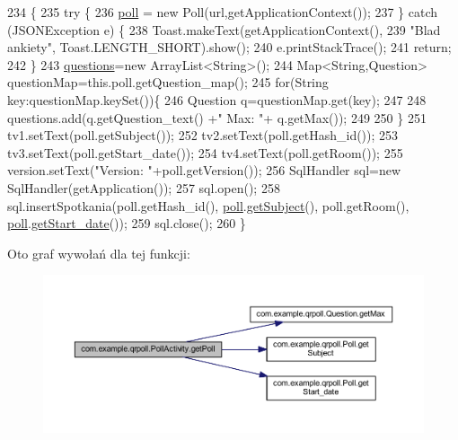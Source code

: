 \begin{DoxyCode}
234                                    \{
235         \textcolor{keywordflow}{try} \{
236             \hyperlink{classcom_1_1example_1_1qrpoll_1_1_poll_activity_accbd807fe57852d64377c5a96401c376}{poll} = \textcolor{keyword}{new} Poll(url,getApplicationContext());
237         \} \textcolor{keywordflow}{catch} (JSONException e) \{
238             Toast.makeText(getApplicationContext(),
239                     \textcolor{stringliteral}{"Blad ankiety"}, Toast.LENGTH\_SHORT).show();
240             e.printStackTrace();
241             \textcolor{keywordflow}{return};
242         \}
243         \hyperlink{classcom_1_1example_1_1qrpoll_1_1_poll_activity_ae9caea6dcd77802d9edc7f86ace0fc5c}{questions}=\textcolor{keyword}{new} ArrayList<String>();
244         Map<String,Question> questionMap=this.poll.getQuestion\_map();
245         \textcolor{keywordflow}{for}(String key:questionMap.keySet())\{
246             Question q=questionMap.get(key);
247             
248             questions.add(q.getQuestion\_text() +\textcolor{stringliteral}{"   Max: "}+ q.getMax());
249             
250         \}
251         tv1.setText(poll.getSubject());
252         tv2.setText(poll.getHash\_id());
253         tv3.setText(poll.getStart\_date());
254         tv4.setText(poll.getRoom());
255         version.setText(\textcolor{stringliteral}{"Version: "}+poll.getVersion());
256         SqlHandler sql=\textcolor{keyword}{new} SqlHandler(getApplication());
257         sql.open();
258         sql.insertSpotkania(poll.getHash\_id(), \hyperlink{classcom_1_1example_1_1qrpoll_1_1_poll_activity_accbd807fe57852d64377c5a96401c376}{poll}.\hyperlink{classcom_1_1example_1_1qrpoll_1_1_poll_af744727f34328a8fec2cb1aba1bc5f66}{getSubject}(), poll.getRoom(), 
      \hyperlink{classcom_1_1example_1_1qrpoll_1_1_poll_activity_accbd807fe57852d64377c5a96401c376}{poll}.\hyperlink{classcom_1_1example_1_1qrpoll_1_1_poll_a51e13329a38c4ee0fc09ccac02ae5afe}{getStart\_date}());
259         sql.close();
260         \}
\end{DoxyCode}


Oto graf wywołań dla tej funkcji\+:
\nopagebreak
\begin{figure}[H]
\begin{center}
\leavevmode
\includegraphics[width=350pt]{classcom_1_1example_1_1qrpoll_1_1_poll_activity_aa474b030c95c180e2ac43c778c5e0fc9_cgraph}
\end{center}
\end{figure}




